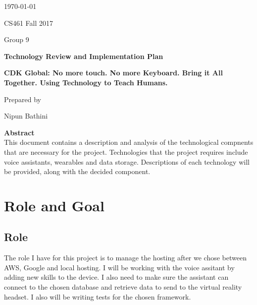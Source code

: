 \documentclass[onecolumn, draftclsnofoot,10pt, compsoc]{IEEEtran}
\newcommand{\NameSigPair}[1]{\par
\makebox[2.75in][r]{#1} \hfil 	\makebox[3.25in]{\makebox[2.25in]{\hrulefill} \hfill		\makebox[.75in]{\hrulefill}}
\par\vspace{-12pt} \textit{\tiny\noindent
\makebox[2.75in]{} \hfil		\makebox[3.25in]{\makebox[2.25in][r]{Signature} \hfill	\makebox[.75in][r]{Date}}}}
\renewcommand{\NameSigPair}[1]{#1}
\begin{document}
\begin{titlepage}
    \begin{singlespace}
        \hfill 
        \par\vspace{.2in}
        \centering
        \scshape{
            {\large\today}\par
			{\large CS461 Fall 2017}\par
			{\large Group 9}\par
            \vspace{2.5in}
            \textbf{\Huge{Technology Review and Implementation Plan}}\par
			\textbf{\large{CDK Global: No more touch. No more Keyboard. Bring it All Together. Using Technology to Teach Humans.}}\par
            \vspace{2.5in}
            {\large Prepared by }\par
            \vspace{5pt}
            {\Large
                \NameSigPair{Nipun Bathini}\par
			\vfill
			\textbf{Abstract} \\
            \indent 
				This document contains a description and analysis of the technological compnents that are necessary for the project. Technologies that the project requires include voice assistants, wearables and data storage.
				Descriptions of each technology will be provided, along with the decided component.
            }
            \vspace{20pt}
        }
      
    \end{singlespace}
\end{titlepage}
\newpage
{}
\tableofcontents
\clearpage


\section{Role and Goal}
	\subsection{Role}
	
		The role I have for this project is to manage the hosting after we chose between AWS, Google and local hosting. I will be working with the voice assitant by adding new skills
		to the device. I also need to make sure the assistant can connect to the chosen database and retrieve data to send to the virtual reality headset. I also will be writing tests
		for the chosen framework. 
		
\end{document}
